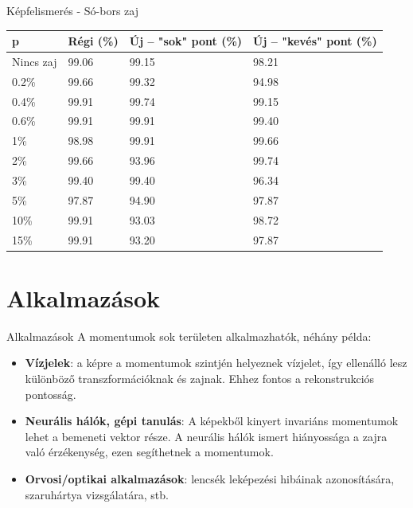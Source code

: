 \documentclass{beamer}
\begin{document}
\begin{frame}{Képfelismerés - Só-bors zaj}
    \vskip 1cm
    \begin{table}[tbp]
        \centering
        \begin{tabular}{|p{1.5cm}|p{1.5cm}|p{1.8cm}|p{2cm}|} \hline
            p & \textbf{Régi} (\%) & \textbf{Új} -- "sok" pont (\%)& \textbf{Új} -- "kevés" pont (\%) \\ \hline\hline
            Nincs zaj & 99.06 & 99.15 & 98.21 \\ \hline
            0.2\% & 99.66 & 99.32 & 94.98 \\ \hline
            0.4\% & 99.91 & 99.74 & 99.15 \\ \hline
            0.6\% & 99.91 & 99.91 & 99.40 \\ \hline
            1\% & 98.98 & 99.91 & 99.66 \\ \hline
            2\% & 99.66 & 93.96 & 99.74 \\ \hline
            3\% & 99.40 & 99.40 & 96.34 \\ \hline
            5\% & 97.87 & 94.90 & 97.87 \\ \hline
            10\% & 99.91 & 93.03 & 98.72 \\ \hline
            15\% & 99.91 & 93.20 & 97.87 \\ \hline
        \end{tabular}
    \end{table}
\end{frame}

\section{Alkalmazások}
\begin{frame}{Alkalmazások}
    A momentumok sok területen alkalmazhatók, néhány példa:
    \begin{itemize}
    \item \textbf{Vízjelek}: a képre a momentumok szintjén helyeznek vízjelet, így ellenálló lesz különböző transzformációknak és zajnak. Ehhez fontos a rekonstrukciós pontosság.
    \item \textbf{Neurális hálók, gépi tanulás}: A képekből kinyert invariáns momentumok lehet a bemeneti vektor része. A neurális hálók ismert hiányossága a zajra való érzékenység, ezen segíthetnek a momentumok.
    \item \textbf{Orvosi/optikai alkalmazások}: lencsék leképezési hibáinak azonosítására, szaruhártya vizsgálatára, stb.
    \end{itemize}
\end{frame}
\end{document}
